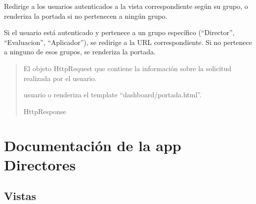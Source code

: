 \documentclass[letterpaper,10pt,spanish]{sphinxmanual}
\begin{document}
\begin{fulllineitems}

\pysigstartsignatures
{}
\pysigstopsignatures
\sphinxAtStartPar
Redirige a los usuarios autenticados a la vista correspondiente
según su grupo, o renderiza la portada si no pertenecen a ningún grupo.

\sphinxAtStartPar
Si el usuario está autenticado y pertenece a un grupo específico
(“Director”, “Evaluacion”, “Aplicador”), se redirige a la URL
correspondiente. Si no pertenece a ninguno de esos grupos, se
renderiza la portada.
\begin{quote}\begin{description}
\sphinxAtStartPar
{} \textendash{} El objeto HttpRequest que contiene la información sobre la
solicitud realizada por el usuario.

\sphinxAtStartPar
\begin{description}
\sphinxAtStartPar
usuario o renderiza el template “dashboard/portada.html”.

\end{description}


\sphinxAtStartPar
HttpResponse

\end{description}\end{quote}

\end{fulllineitems}


\sphinxstepscope


\chapter{Documentación de la app Directores}
\label{\detokenize{directores:documentacion-de-la-app-directores}}\label{\detokenize{directores::doc}}

\section{Vistas}
\label{\detokenize{directores:vistas}}
\end{document}
